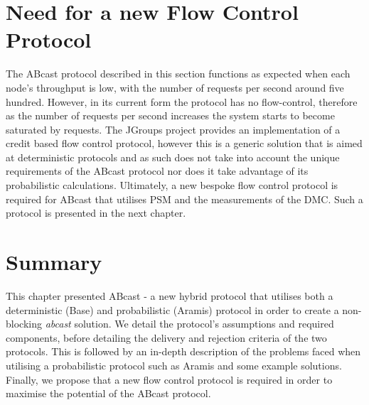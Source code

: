 \section{Need for a new Flow Control Protocol}
The \textsf{ABcast} protocol described in this section functions as expected when each node's throughput is low, with the number of requests per second around five hundred.  However, in its current form the protocol has no flow-control, therefore as the number of requests per second increases the system starts to become saturated by requests.  The JGroups project provides an implementation of a credit based flow control protocol, however this is a generic solution that is aimed at deterministic protocols and as such does not take into account the unique requirements of the \textsf{ABcast} protocol nor does it take advantage of its probabilistic calculations.  Ultimately, a new bespoke flow control protocol is required for \textsf{ABcast} that utilises PSM and the measurements of the DMC.  Such a protocol is presented in the next chapter.  

\section{Summary}
This chapter presented \textsf{ABcast} - a new hybrid protocol that utilises both a deterministic (\textsf{Base}) and probabilistic (\textsf{Aramis}) protocol in order to create a non-blocking \emph{abcast} solution.  We detail the protocol's assumptions and required components, before detailing the delivery and rejection criteria of the two protocols.  This is followed by an in-depth description of the problems faced when utilising a probabilistic protocol such as \textsf{Aramis} and some example solutions.  Finally, we propose that a new flow control protocol is required in order to maximise the potential of the \textsf{ABcast} protocol.  